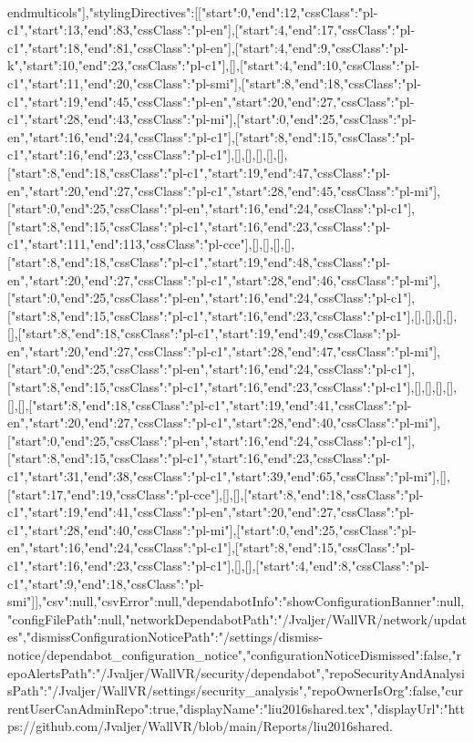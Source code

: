 \\end{multicols}"],"stylingDirectives":[[{"start":0,"end":12,"cssClass":"pl-c1"},{"start":13,"end":83,"cssClass":"pl-en"}],[{"start":4,"end":17,"cssClass":"pl-c1"},{"start":18,"end":81,"cssClass":"pl-en"}],[{"start":4,"end":9,"cssClass":"pl-k"},{"start":10,"end":23,"cssClass":"pl-c1"}],[],[{"start":4,"end":10,"cssClass":"pl-c1"},{"start":11,"end":20,"cssClass":"pl-smi"}],[{"start":8,"end":18,"cssClass":"pl-c1"},{"start":19,"end":45,"cssClass":"pl-en"},{"start":20,"end":27,"cssClass":"pl-c1"},{"start":28,"end":43,"cssClass":"pl-mi"}],[{"start":0,"end":25,"cssClass":"pl-en"},{"start":16,"end":24,"cssClass":"pl-c1"}],[{"start":8,"end":15,"cssClass":"pl-c1"},{"start":16,"end":23,"cssClass":"pl-c1"}],[],[],[],[],[],[{"start":8,"end":18,"cssClass":"pl-c1"},{"start":19,"end":47,"cssClass":"pl-en"},{"start":20,"end":27,"cssClass":"pl-c1"},{"start":28,"end":45,"cssClass":"pl-mi"}],[{"start":0,"end":25,"cssClass":"pl-en"},{"start":16,"end":24,"cssClass":"pl-c1"}],[{"start":8,"end":15,"cssClass":"pl-c1"},{"start":16,"end":23,"cssClass":"pl-c1"},{"start":111,"end":113,"cssClass":"pl-cce"}],[],[],[],[],[{"start":8,"end":18,"cssClass":"pl-c1"},{"start":19,"end":48,"cssClass":"pl-en"},{"start":20,"end":27,"cssClass":"pl-c1"},{"start":28,"end":46,"cssClass":"pl-mi"}],[{"start":0,"end":25,"cssClass":"pl-en"},{"start":16,"end":24,"cssClass":"pl-c1"}],[{"start":8,"end":15,"cssClass":"pl-c1"},{"start":16,"end":23,"cssClass":"pl-c1"}],[],[],[],[],[],[{"start":8,"end":18,"cssClass":"pl-c1"},{"start":19,"end":49,"cssClass":"pl-en"},{"start":20,"end":27,"cssClass":"pl-c1"},{"start":28,"end":47,"cssClass":"pl-mi"}],[{"start":0,"end":25,"cssClass":"pl-en"},{"start":16,"end":24,"cssClass":"pl-c1"}],[{"start":8,"end":15,"cssClass":"pl-c1"},{"start":16,"end":23,"cssClass":"pl-c1"}],[],[],[],[],[],[],[{"start":8,"end":18,"cssClass":"pl-c1"},{"start":19,"end":41,"cssClass":"pl-en"},{"start":20,"end":27,"cssClass":"pl-c1"},{"start":28,"end":40,"cssClass":"pl-mi"}],[{"start":0,"end":25,"cssClass":"pl-en"},{"start":16,"end":24,"cssClass":"pl-c1"}],[{"start":8,"end":15,"cssClass":"pl-c1"},{"start":16,"end":23,"cssClass":"pl-c1"},{"start":31,"end":38,"cssClass":"pl-c1"},{"start":39,"end":65,"cssClass":"pl-mi"}],[],[{"start":17,"end":19,"cssClass":"pl-cce"}],[],[],[{"start":8,"end":18,"cssClass":"pl-c1"},{"start":19,"end":41,"cssClass":"pl-en"},{"start":20,"end":27,"cssClass":"pl-c1"},{"start":28,"end":40,"cssClass":"pl-mi"}],[{"start":0,"end":25,"cssClass":"pl-en"},{"start":16,"end":24,"cssClass":"pl-c1"}],[{"start":8,"end":15,"cssClass":"pl-c1"},{"start":16,"end":23,"cssClass":"pl-c1"}],[],[],[{"start":4,"end":8,"cssClass":"pl-c1"},{"start":9,"end":18,"cssClass":"pl-smi"}]],"csv":null,"csvError":null,"dependabotInfo":{"showConfigurationBanner":null,"configFilePath":null,"networkDependabotPath":"/Jvaljer/WallVR/network/updates","dismissConfigurationNoticePath":"/settings/dismiss-notice/dependabot_configuration_notice","configurationNoticeDismissed":false,"repoAlertsPath":"/Jvaljer/WallVR/security/dependabot","repoSecurityAndAnalysisPath":"/Jvaljer/WallVR/settings/security_analysis","repoOwnerIsOrg":false,"currentUserCanAdminRepo":true},"displayName":"liu2016shared.tex","displayUrl":"https://github.com/Jvaljer/WallVR/blob/main/Reports/liu2016shared.